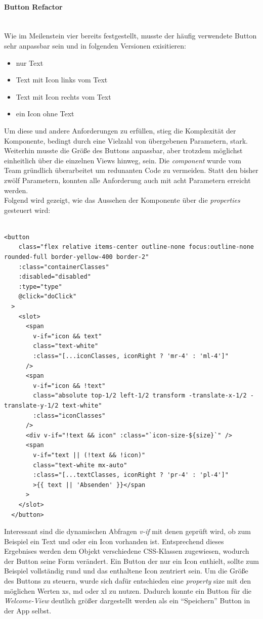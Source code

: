 \documentclass[10pt, a4paper]{article}
\begin{document}
\begin{onehalfspace}
\paragraph*{Button Refactor} $~$ \\
Wie im Meilenstein vier bereits festgestellt, musste der häufig verwendete Button sehr anpassbar sein und in folgenden Versionen exisitieren:
\begin{itemize}
  \item nur Text
  \item Text mit Icon links vom Text
  \item Text mit Icon rechts vom Text
  \item ein Icon ohne Text
\end{itemize}
Um diese und andere Anforderungen zu erfüllen, stieg die Komplexität der Komponente, bedingt durch eine Vielzahl von übergebenen Parametern, stark.
Weiterhin musste die Größe des Buttons anpassbar, aber trotzdem möglichst einheitlich über die einzelnen Views hinweg, sein. Die \textit{component} wurde vom Team gründlich überarbeitet um redunanten Code zu vermeiden. Statt den bisher zwölf Parametern, konnten alle Anforderung auch mit acht Parametern erreicht werden.
\\
Folgend wird gezeigt, wie das Aussehen der Komponente über die \textit{properties} gesteuert wird:
\\~\\
\begin{minipage}{\textwidth}
  \begin{lstlisting}[caption={Codesnippets vom Button}, captionpos=b]
    <button
    class="flex relative items-center outline-none focus:outline-none rounded-full border-yellow-400 border-2"
    :class="containerClasses"
    :disabled="disabled"
    :type="type"
    @click="doClick"
  >
    <slot>
      <span
        v-if="icon && text"
        class="text-white"
        :class="[...iconClasses, iconRight ? 'mr-4' : 'ml-4']"
      />
      <span
        v-if="icon && !text"
        class="absolute top-1/2 left-1/2 transform -translate-x-1/2 -translate-y-1/2 text-white"
        :class="iconClasses"
      />
      <div v-if="!text && icon" :class="`icon-size-${size}`" />
      <span
        v-if="text || (!text && !icon)"
        class="text-white mx-auto"
        :class="[...textClasses, iconRight ? 'pr-4' : 'pl-4']"
        >{{ text || 'Absenden' }}</span
      >
    </slot>
  </button>
  \end{lstlisting}
\end{minipage}
Interessant sind die dynamischen Abfragen \textit{v-if} mit denen geprüft wird, ob zum Beispiel ein Text und oder ein Icon vorhanden ist. Entsprechend dieses Ergebnises werden dem Objekt verschiedene CSS-Klassen zugewiesen, wodurch der Button seine Form verändert.
Ein Button der nur ein Icon enthielt, sollte zum Beispiel vollständig rund und das enthaltene Icon zentriert sein.
Um die Größe des Buttons zu steuern, wurde sich dafür entschieden eine \textit{property} \glqq size\grqq{} mit den möglichen Werten \glqq xs\grqq , \glqq md\grqq{} oder \glqq xl\grqq{} zu nutzen.
Dadurch konnte ein Button für die \textit{Welcome-View} deutlich größer dargestellt werden als ein \enquote{Speichern} Button in der App selbst.


\end{onehalfspace}
\end{document}
